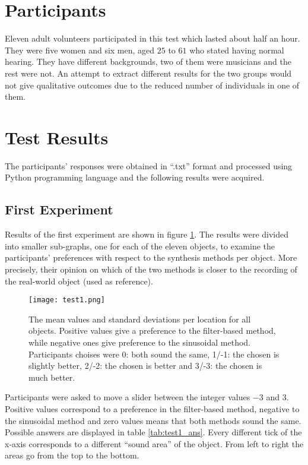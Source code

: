 \section{Participants}
Eleven adult volunteers participated in this test which lasted about half an hour. They were five women and six men, aged $25$ to $61$ who stated having normal hearing. They have different backgrounds, two of them were musicians and the rest were not. An attempt to extract different results for the two groups would not give qualitative outcomes due to the reduced number of individuals in one of them.

\section{Test Results}
The participants' responses were obtained in ``.txt'' format and processed using Python programming language and the following results were acquired.

\subsection{First Experiment}
Results of the first experiment are shown in figure \ref{fig:test1}. The results were divided into smaller sub-graphs, one for each of the eleven objects, to examine the participants' preferences with respect to the synthesis methods per object. More precisely, their opinion on which of the two methods is closer to the recording of the real-world object (used as reference).

\begin{figure}[H]
  \centering
    \texttt{[image: test1.png]}
      \caption{The mean values and standard deviations per location for all objects. Positive values give a preference to the filter-based method, while negative ones give preference to the sinusoidal method. Participants choises were 0: both sound the same, 1/-1: the chosen is slightly better, 2/-2: the chosen is better and 3/-3: the chosen is much better.}\label{fig:test1}
\end{figure}

Participants were asked to move a slider between the integer values $-3$ and $3$. Positive values correspond to a preference in the filter-based method, negative to the sinusoidal method and zero values means that both methods sound the same. Possible answers are displayed in table \ref{tab:test1_ans}. Every different tick of the x-axis corresponds to a different ``sound area'' of the object. From left to right the areas go from the top to the bottom.

